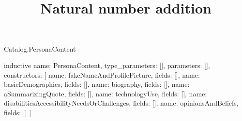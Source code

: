 \begin{lexlean}{Catalog.PersonaContent}
\title{Natural number addition}
\begin{semanticmodule}
inductive{
  name: PersonaContent,
  type_parameters: [],
  parameters: [],
  constructors: [
    {name: fakeNameAndProfilePicture, fields: []},
    {name: basicDemographics, fields: []},
    {name: biography, fields: []},
    {name: aSummarizingQuote, fields: []},
    {name: technologyUse, fields: []},
    {name: disabilitiesAccessibilityNeedsOrChallenges, fields: []},
    {name: opinionsAndBeliefs, fields: []}
  ]
}
\end{semanticmodule}
\end{lexlean}

